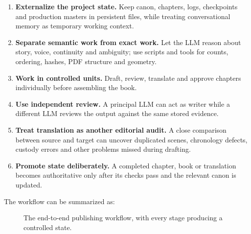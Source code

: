 \documentclass[11pt,oneside,openany]{book}
\providecommand{\tightlist}{%
  \setlength{\itemsep}{0pt}\setlength{\parskip}{0pt}}
\begin{document}
\begin{enumerate}
\def\labelenumi{\arabic{enumi}.}
\tightlist
\item
  \textbf{Externalize the project state.} Keep canon, chapters, logs, checkpoints and production masters in persistent files, while treating conversational memory as temporary working context.
\item
  \textbf{Separate semantic work from exact work.} Let the LLM reason about story, voice, continuity and ambiguity; use scripts and tools for counts, ordering, hashes, PDF structure and geometry.
\item
  \textbf{Work in controlled units.} Draft, review, translate and approve chapters individually before assembling the book.
\item
  \textbf{Use independent review.} A principal LLM can act as writer while a different LLM reviews the output against the same stored evidence.
\item
  \textbf{Treat translation as another editorial audit.} A close comparison between source and target can uncover duplicated scenes, chronology defects, custody errors and other problems missed during drafting.
\item
  \textbf{Promote state deliberately.} A completed chapter, book or translation becomes authoritative only after its checks pass and the relevant canon is updated.
\end{enumerate}

The workflow can be summarized as:

\begin{figure}[htbp]
\centering
{}
\caption{The end-to-end publishing workflow, with every stage producing a controlled state.}
\end{figure}
\end{document}

